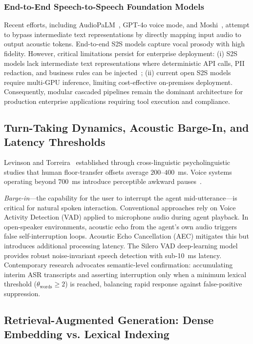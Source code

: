 \documentclass[11pt,a4paper]{article}
\begin{document}
\subsubsection{End-to-End Speech-to-Speech Foundation Models}
Recent efforts, including AudioPaLM~\cite{rubenstein2023audiopalm}, GPT-4o voice mode, and Moshi~\cite{defossez2024moshi}, attempt to bypass intermediate text representations by directly mapping input audio to output acoustic tokens. End-to-end S2S models capture vocal prosody with high fidelity. However, critical limitations persist for enterprise deployment: (i) S2S models lack intermediate text representations where deterministic API calls, PII redaction, and business rules can be injected~\cite{defossez2024moshi}; (ii) current open S2S models require multi-GPU inference, limiting cost-effective on-premises deployment. Consequently, modular cascaded pipelines remain the dominant architecture for production enterprise applications requiring tool execution and compliance.

\subsection{Turn-Taking Dynamics, Acoustic Barge-In, and Latency Thresholds}
\label{subsec:rw_turntaking}

Levinson and Torreira~\cite{levinson2015timing} established through cross-linguistic psycholinguistic studies that human floor-transfer offsets average $200$--$400$~ms. Voice systems operating beyond $700$~ms introduce perceptible awkward pauses~\cite{larson2020turn}.

\textit{Barge-in}---the capability for the user to interrupt the agent mid-utterance---is critical for natural spoken interaction. Conventional approaches rely on Voice Activity Detection (VAD) applied to microphone audio during agent playback. In open-speaker environments, acoustic echo from the agent's own audio triggers false self-interruption loops. Acoustic Echo Cancellation (AEC) mitigates this but introduces additional processing latency. The Silero VAD deep-learning model~\cite{silero2021vad} provides robust noise-invariant speech detection with sub-10~ms latency. Contemporary research advocates semantic-level confirmation: accumulating interim ASR transcripts and asserting interruption only when a minimum lexical threshold ($\theta_{\text{words}} \ge 2$) is reached, balancing rapid response against false-positive suppression.

\subsection{Retrieval-Augmented Generation: Dense Embedding vs. Lexical Indexing}
\label{subsec:rw_rag}
\end{document}
